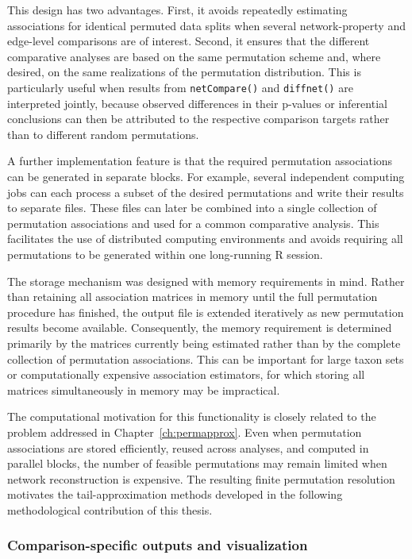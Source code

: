 This design has two advantages. First, it avoids repeatedly estimating associations for identical permuted data splits when several network-property and edge-level comparisons are of interest. Second, it ensures that the different comparative analyses are based on the same permutation scheme and, where desired, on the same realizations of the permutation distribution. This is particularly useful when results from \texttt{netCompare()} and \texttt{diffnet()} are interpreted jointly, because observed differences in their p-values or inferential conclusions can then be attributed to the respective comparison targets rather than to different random permutations.

A further implementation feature is that the required permutation associations can be generated in separate blocks. For example, several independent computing jobs can each process a subset of the desired permutations and write their results to separate files. These files can later be combined into a single collection of permutation associations and used for a common comparative analysis. This facilitates the use of distributed computing environments and avoids requiring all permutations to be generated within one long-running R session.

\newpage
The storage mechanism was designed with memory requirements in mind. Rather than retaining all association matrices in memory until the full permutation procedure has finished, the output file is extended iteratively as new permutation results become available. Consequently, the memory requirement is determined primarily by the matrices currently being estimated rather than by the complete collection of permutation associations. This can be important for large taxon sets or computationally expensive association estimators, for which storing all matrices simultaneously in memory may be impractical.

The computational motivation for this functionality is closely related to the problem addressed in Chapter~\ref{ch:permapprox}. Even when permutation associations are stored efficiently, reused across analyses, and computed in parallel blocks, the number of feasible permutations may remain limited when network reconstruction is expensive. The resulting finite permutation resolution motivates the tail-approximation methods developed in the following methodological contribution of this thesis.



\subsubsection{Comparison-specific outputs and visualization}

